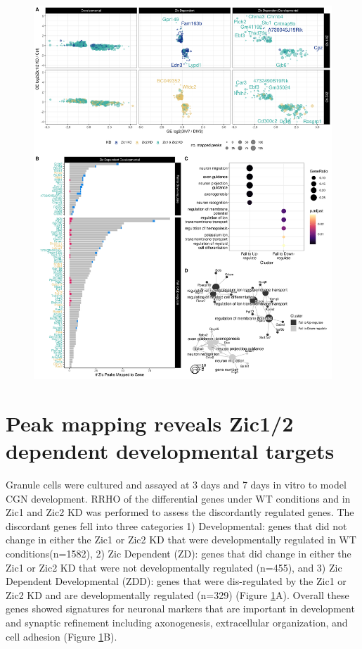 \documentclass[fleqn,10pt,twocolumn]{wlscirep}
\begin{document}
\begin{figure}[!ht]
\includegraphics[width=.95\textwidth]{Figures/figure4.png}
\caption{}
\label{fig:ZicKD}
\end{figure}

\section*{Peak mapping reveals Zic1/2 dependent developmental targets}
Granule cells were cultured and assayed at 3 days and 7 days in vitro to model CGN development. RRHO of the differential genes under WT conditions and in Zic1 and Zic2 KD was performed to assess the discordantly regulated genes. The discordant genes fell into three categories 1) Developmental: genes that did not change in either the Zic1 or Zic2 KD that were developmentally regulated in WT conditions(n=1582), 2) Zic Dependent (ZD): genes that did change in either the Zic1 or Zic2 KD that were not developmentally regulated (n=455), and 3) Zic Dependent Developmental (ZDD): genes that were dis-regulated by the Zic1 or Zic2 KD and are developmentally regulated (n=329) (Figure \ref{fig:ZicKD}A). Overall these genes showed signatures for neuronal markers that are important in development and synaptic refinement including axonogenesis, extracellular organization, and cell adhesion (Figure \ref{fig:ZicKD}B). 
\end{document}
